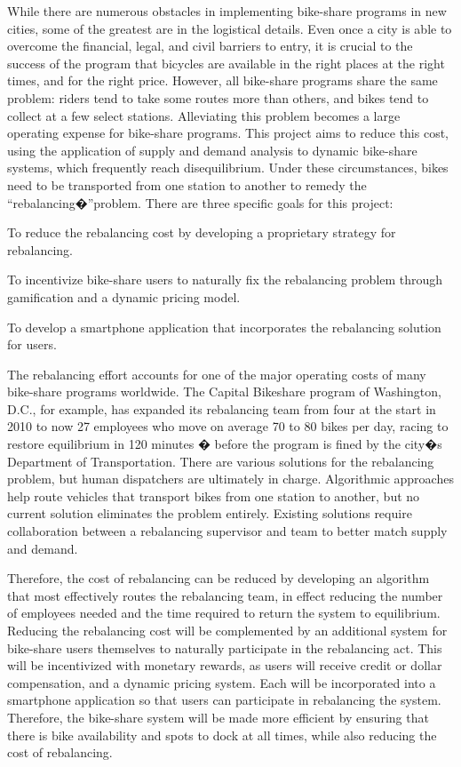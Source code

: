 \documentclass{sig-alternate}
\begin{document}
While there are numerous obstacles in implementing bike-share programs in new cities, some of the greatest are in the logistical details. Even once a city is able to overcome the financial, legal, and civil barriers to entry, it is crucial to the success of the program that bicycles are available in the right places at the right times, and for the right price. However, all bike-share programs share the same problem: riders tend to take some routes more than others, and bikes tend to collect at a few select stations. Alleviating this problem becomes a large operating expense for bike-share programs. This project aims to reduce this cost, using the application of supply and demand analysis to dynamic bike-share systems, which frequently reach disequilibrium. Under these circumstances, bikes need to be transported from one station to another to remedy the ``rebalancing�''problem. There are three specific goals for this project:
\begin{itemize*}
	\item To reduce the rebalancing cost by developing a proprietary strategy for rebalancing.
         \item To incentivize bike-share users to naturally fix the rebalancing problem through gamification and a dynamic pricing model.
         \item To develop a smartphone application that incorporates the rebalancing solution for users.
\end{itemize*}

The rebalancing effort accounts for one of the major operating costs of many bike-share programs worldwide. The Capital Bikeshare program of Washington, D.C., for example, has expanded its rebalancing team from four at the start in 2010 to now 27 employees who move on average 70 to 80 bikes per day, racing to restore equilibrium in 120 minutes � before the program is fined by the city�s Department of Transportation. There are various solutions for the rebalancing problem, but human dispatchers are ultimately in charge. Algorithmic approaches help route vehicles that transport bikes from one station to another, but no current solution eliminates the problem entirely. Existing solutions require collaboration between a rebalancing supervisor and team to better match supply and demand.
\newline

Therefore, the cost of rebalancing can be reduced by developing an algorithm that most effectively routes the rebalancing team, in effect reducing the number of employees needed and the time required to return the system to equilibrium. Reducing the rebalancing cost will be complemented by an additional system for bike-share users themselves to naturally participate in the rebalancing act. This will be incentivized with monetary rewards, as users will receive credit or dollar compensation, and a dynamic pricing system. Each will be incorporated into a smartphone application so that users can participate in rebalancing the system. Therefore, the bike-share system will be made more efficient by ensuring that there is bike availability and spots to dock at all times, while also reducing the cost of rebalancing.
\end{document}

